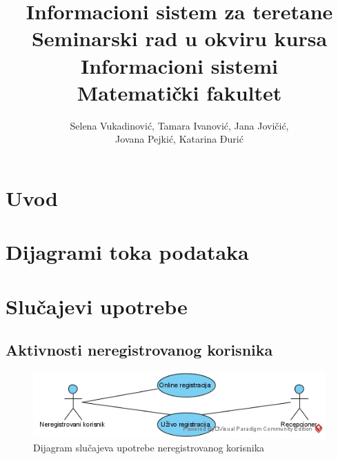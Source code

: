 \documentclass[a4paper]{article}
\begin{document}
\title{Informacioni sistem za teretane\\ \small{Seminarski rad u okviru kursa\\Informacioni sistemi\\ Matematički fakultet}}

\author{Selena Vukadinović, Tamara Ivanović, Jana Jovičić, \\Jovana Pejkić, Katarina Đurić}


\maketitle
\newpage

\tableofcontents
\newpage


\section{Uvod}
\label{sec:uvod}



\section{Dijagrami toka podataka}



\section{Slučajevi upotrebe}


\subsection{Aktivnosti neregistrovanog korisnika}
\begin{figure}[!ht]
\begin{center}
\includegraphics[scale=0.55]{sections/images/dijagram_slucajeva_upotrebe_neregistrovanog_korisnika.jpg}
\end{center}
\caption{Dijagram slučajeva upotrebe neregistrovanog korisnika}
\label{fig:kontekst}
\end{figure}
\end{document}

